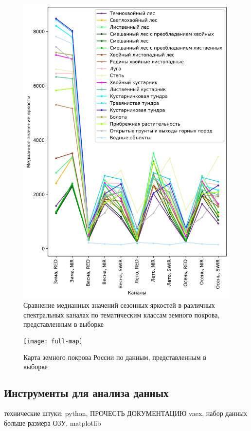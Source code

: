 \documentclass[14pt, a4paper, oneside]{extarticle}
\begin{document}
\begin{figure}[H]
    \caption{Сравнение медианных значений сезонных яркостей в различных спектральных каналах по тематическим классам земного покрова, представленным в выборке}
    \centering
    \includegraphics[]{class-comparison}
\end{figure}

\begin{landscape}
\begin{figure}[H]
    \caption{Карта земного покрова России по данным, представленным в выборке}
    \centering
    \texttt{[image: full-map]}
\end{figure}
\end{landscape}

\subsection{Инструменты для анализа данных}
технические штуки: python, ПРОЧЕСТЬ ДОКУМЕНТАЦИЮ vaex, набор данных больше размера ОЗУ, matplotlib
\end{document}
